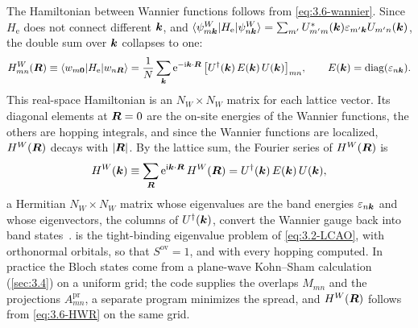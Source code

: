 The Hamiltonian between Wannier functions follows from \cref{eq:3.6-wannier}. Since $H_{\mathrm{e}}$ does not connect different $\bm{k}$, and $\langle\psi^W_{m\bm{k}}|H_{\mathrm{e}}|\psi^W_{n\bm{k}}\rangle = \sum_{m'}U^*_{m'm}(\bm{k})\varepsilon_{m'\bm{k}}U_{m'n}(\bm{k})$, the double sum over $\bm{k}$ collapses to one:
\begin{equation}
  H^W_{mn}(\bm{R}) \equiv \langle w_{m\bm{0}}|H_{\mathrm{e}}|w_{n\bm{R}}\rangle
  = \frac1N\sum_{\bm{k}}\mathrm{e}^{-\mathrm{i}\bm{k}\cdot\bm{R}}\,\bigl[U^\dagger(\bm{k})\,E(\bm{k})\,U(\bm{k})\bigr]_{mn},
  \qquad E(\bm{k}) = \mathrm{diag}(\varepsilon_{n\bm{k}}) .
  \label{eq:3.6-HWR}
\end{equation}
This real-space Hamiltonian is an $N_W\times N_W$ matrix for each lattice vector. Its diagonal elements at $\bm{R} = 0$ are the on-site energies of the Wannier functions, the others are hopping integrals, and since the Wannier functions are localized, $H^W(\bm{R})$ decays with $|\bm{R}|$. By the lattice sum, the Fourier series of $H^W(\bm{R})$ is
\begin{equation}
  H^W(\bm{k}) \equiv \sum_{\bm{R}}\mathrm{e}^{\mathrm{i}\bm{k}\cdot\bm{R}}\,H^W(\bm{R}) = U^\dagger(\bm{k})\,E(\bm{k})\,U(\bm{k}) ,
  \label{eq:3.6-HWk}
\end{equation}
a Hermitian $N_W\times N_W$ matrix whose eigenvalues are the band energies $\varepsilon_{n\bm{k}}$ and whose eigenvectors, the columns of $U^\dagger(\bm{k})$, convert the Wannier gauge back into band states~\cite[Eqs.~(98) and (99)]{marzari2012maximally}.  is the tight-binding eigenvalue problem of \cref{eq:3.2-LCAO}, with orthonormal orbitals, so that $S^{\mathrm{ov}} = 1$, and with every hopping computed. In practice the Bloch states come from a plane-wave Kohn--Sham calculation (\cref{sec:3.4}) on a uniform grid; the code supplies the overlaps $M_{mn}$ and the projections $A^{\mathrm{pr}}_{mn}$, a separate program minimizes the spread, and $H^W(\bm{R})$ follows from \cref{eq:3.6-HWR} on the same grid.

